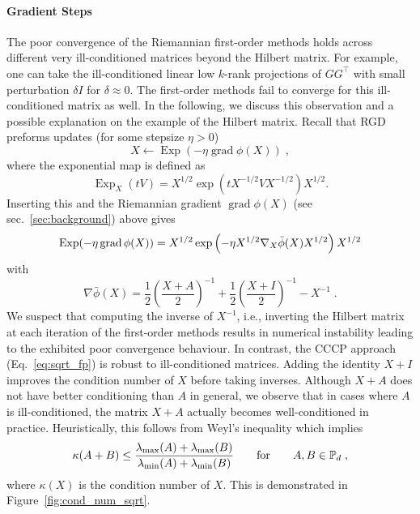 \documentclass[sn-nature]{sn-jnl}%
\theoremstyle{thmstyleone}%
\theoremstyle{thmstyletwo}%
\theoremstyle{thmstylethree}%
\begin{document}
\paragraph{Gradient Steps}
The poor convergence of the Riemannian first-order methods holds across different very ill-conditioned matrices beyond the Hilbert matrix. For example, one can take the ill-conditioned linear low $k$-rank projections of $G G^\top$ with small perturbation $\delta I$ for $\delta \approx 0$. The first-order methods fail to converge for this ill-conditioned matrix as well.
In the following, we discuss this observation and a possible explanation on the example of the Hilbert matrix.
Recall that RGD preforms updates (for some stepsize $\eta > 0$)
\[
X \leftarrow \operatorname{Exp}(-\eta \operatorname{grad}\phi(X)) \; ,
\]
where the exponential map is defined as
\[
\operatorname{Exp}_X(t V)=X^{1 / 2} \exp \left(t X^{-1 / 2} V X^{-1 / 2}\right) X^{1 / 2}.
\]
Inserting this and the Riemannian gradient $\operatorname{grad}\phi(X)$ (see sec.~\ref{sec:background}) above gives
\[
\operatorname{Exp}(-\eta \operatorname{grad}\phi(X)) = X^{1/2} \exp \left(-\eta  X^{1/2} \nabla_X \Bar{\phi}(X) X^{1/2} \right)X^{1/2} 
\]
with
\[
\nabla \bar{\phi}(X) = \frac{1}{2}\left(\frac{X+A}{2}\right)^{-1} + \frac{1}{2}\left(\frac{X+I}{2}\right)^{-1} - X^{-1} \; .
\]
We suspect that computing the inverse of $X^{-1}$, i.e., inverting the Hilbert matrix at each iteration of the first-order methods results in numerical instability leading to the exhibited poor convergence behaviour. 
In contrast, the CCCP approach (Eq.~\ref{eq:sqrt_fp}) is robust to ill-conditioned matrices. Adding the identity $X+I$ improves the condition number of $X$ before taking inverses. Although $X+A$ does not have better conditioning than $A$ in general, we observe that in cases where $A$ is ill-conditioned, the matrix $X+A$ actually becomes well-conditioned in practice. Heuristically, this follows from Weyl's inequality which implies 
    \[
    \kappa(A+B) \leq \frac{\lambda_{\max}(A) + \lambda_{\max}(B)}{\lambda_{\min}(A) + \lambda_{\min}(B)} \qquad \text{for} \qquad A,B \in \mathbb{P}_d \; ,
    \]
    where $\kappa(X)$ is the condition number of $X.$ This is demonstrated in Figure~\ref{fig:cond_num_sqrt}.
%
\end{document}
